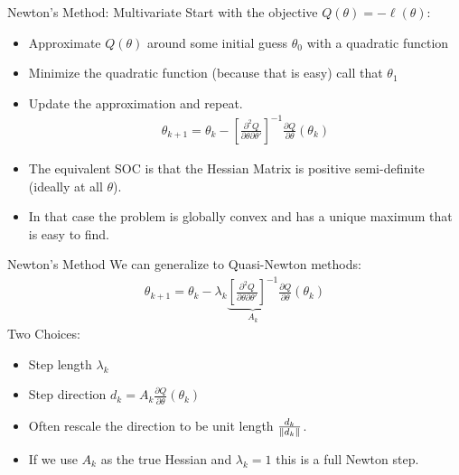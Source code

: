 \begin{frame}{Newton's Method: Multivariate}
Start with the objective $Q(\theta) = - \ell(\theta)$:
\begin{itemize}
\item Approximate $Q(\theta)$ around some initial guess $\theta_0$ with a quadratic function
\item Minimize the quadratic function (because that is easy) call that $\theta_1$
\item Update the approximation and repeat.
\begin{align*}
\theta_{k+1} = \theta_k - \left[ \frac{\partial^2 Q}{\partial \theta \partial \theta'} \right]^{-1}\frac{\partial Q}{\partial \theta}(\theta_k)
\end{align*}
\item The equivalent SOC is that the {Hessian Matrix} is \alert{positive semi-definite}  (ideally at all $\theta$).
\item In that case the problem is \alert{globally convex} and has a \alert{unique maximum} that is easy to find.
\end{itemize}
\end{frame}


\begin{frame}{Newton's Method}
We can generalize to Quasi-Newton methods:
\begin{align*}
\theta_{k+1} = \theta_k -  \lambda_k \underbrace{\left[ \frac{\partial^2 Q}{\partial \theta \partial \theta'} \right]^{-1}}_{A_k} \frac{\partial Q}{\partial \theta}(\theta_k)
\end{align*}
Two Choices:
\begin{itemize}
\item Step length $\lambda_k$
\item Step direction $d_k=A_k \frac{\partial Q}{\partial \theta}(\theta_k)$
\item Often rescale the direction to be unit length $\frac{d_k}{\left\lVert d_k\right\rVert}$.
\item If we use $A_k$ as the true Hessian and $\lambda_k=1$ this is a \alert{full Newton step}.
\end{itemize}
\end{frame}

